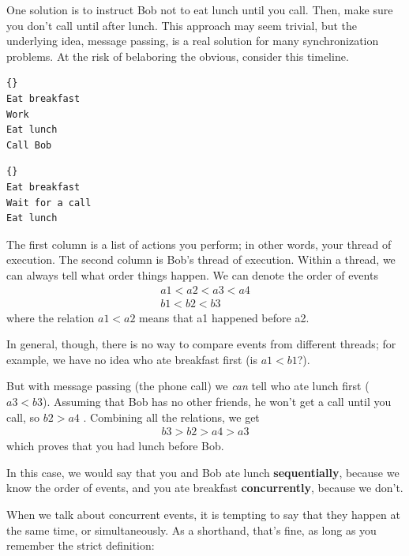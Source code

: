 \documentclass{book}
\begin{document}
One solution is to instruct Bob not to eat lunch until you call.
Then, make sure you don't call until after lunch.  This approach may
seem trivial, but the underlying idea, message passing, is a real
solution for many synchronization problems.
At the risk of belaboring the obvious, consider this timeline.

\noindent\begin{minipage}[t]{0.4\textwidth}
    \begin{lstlisting}[title={Thread A (You)}]{}
Eat breakfast 
Work          
Eat lunch     
Call Bob
\end{lstlisting}
\end{minipage}
\hfill
\noindent\begin{minipage}[t]{0.4\textwidth}
    \begin{lstlisting}[title={Thread B (Bob)}]{}
Eat breakfast
Wait for a call
Eat lunch
\end{lstlisting}
\end{minipage}

The first column is a list of actions you perform; in other words,
your thread of execution.  The second column is Bob's thread of
execution.  Within a thread, we can always tell what order things
happen.  We can denote the order of events
%
\begin{eqnarray*}
    a1 < a2 < a3 < a4  \\
    b1 < b2 < b3
\end{eqnarray*}
%
where the relation $a1 < a2$ means that a1 happened before a2.

In general, though, there is no way to compare events from different
threads; for example, we have no idea who ate breakfast first (is $a1
    < b1$?).

But with message passing (the phone call) we {\em can} tell who ate
lunch first ($a3 < b3$).  Assuming that Bob has no other friends, he
won't get a call until you call, so $b2 > a4$ .  Combining all the
relations, we get
%
\begin{eqnarray*}
    b3 > b2 > a4 > a3
\end{eqnarray*}
%
which proves that you had lunch before Bob.

In this case, we would say that you and Bob ate lunch
    {\bf sequentially}, because we know the order of events, and you
ate breakfast {\bf concurrently}, because we don't.

When we talk about concurrent events, it is tempting to say
that they happen at the same time, or simultaneously.  As a
shorthand, that's fine, as long as you remember the strict
definition:
\end{document}
